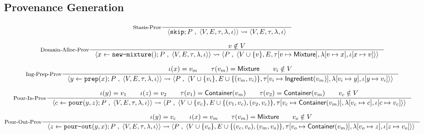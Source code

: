 \documentclass[11pt, a4paper]{article}
\begin{document}
\begin{landscape}
    
\section{Provenance Generation}
\label{prov-gen}
    \[
    \inference[\text{Stasis-Prov}]{}
    {
    \langle
    \text{\texttt{skip}} ; P \;,\;
    \langle V,E,\tau,\lambda,\iota\rangle
    \rangle
    \rightsquigarrow
    \langle V,E,\tau,\lambda,\iota\rangle
    }
    \]

    \[
    \inference[\text{Domain-Alloc-Prov}]
    {
    v \notin V
    }
    {
    \left\langle
    x \leftarrow \text{\texttt{new-mixture}}() ; P \;,\;
    \langle V,E,\tau,\lambda,\iota\rangle
    \right\rangle
    \rightsquigarrow
    \left\langle
    P \;,\;
    \left\langle
    V \cup \{v\},
    E,
    \tau[v \mapsto \textsf{Mixture}],
    \lambda[v \mapsto x],
    \iota[x \mapsto v]
    \right\rangle
    \right\rangle
    }
    \]
    
    \[
    \inference[\text{Ing-Prep-Prov}]
    {
    \iota(x)=v_m
    \qquad
    \tau(v_m)=\mathsf{Mixture}
    \qquad
    v_i \notin V
    }
    {
    \left\langle
    y \leftarrow \text{\texttt{prep}}(x) ; P \;,\;
    \langle V,E,\tau,\lambda,\iota\rangle
    \right\rangle
    \rightsquigarrow
    \left\langle
    P \;,\;
    \left\langle
    V \cup \{v_i\},
    E \cup \{(v_m,v_i)\},
    \tau[v_i \mapsto \mathsf{Ingredient}(v_m)],
    \lambda[v_i \mapsto y],
    \iota[y \mapsto v_i]
    \right\rangle
    \right\rangle
    }
    \]
    
    \[
    \inference[\text{Pour-In-Prov}]
    {
    \iota(y)=v_1
    \qquad
    \iota(z)=v_2
    \qquad
    \tau(v_1)=\mathsf{Container}(v_m)
    \qquad
    \tau(v_2)=\mathsf{Container}(v_m)
    \qquad
    v_c \notin V
    }
    {
    \left\langle
    c \leftarrow \text{\texttt{pour}}(y,z) ; P \;,\;
    \langle V,E,\tau,\lambda,\iota\rangle
    \right\rangle
    \rightsquigarrow
    \left\langle
    P \;,\;
    \left\langle
    V \cup \{v_c\},
    E \cup \{(v_1,v_c),(v_2,v_c)\},
    \tau[v_c \mapsto \mathsf{Container}(v_m)],
    \lambda[v_c \mapsto c],
    \iota[c \mapsto v_c]
    \right\rangle
    \right\rangle
    }
    \]
    
    \[
    \inference[\text{Pour-Out-Prov}]
    {
    \iota(y)=v_c
    \qquad
    \iota(x)=v_m
    \qquad
    \tau(v_m)=\mathsf{Mixture}
    \qquad
    v_o \notin V
    }
    {
    \left\langle
    z \leftarrow \text{\texttt{pour-out}}(y,x) ; P \;,\;
    \langle V,E,\tau,\lambda,\iota\rangle
    \right\rangle
    \rightsquigarrow
    \left\langle
    P \;,\;
    \left\langle
    V \cup \{v_o\},
    E \cup \{(v_c,v_o),(v_m,v_o)\},
    \tau[v_o \mapsto \mathsf{Container}(v_m)],
    \lambda[v_o \mapsto z],
    \iota[z \mapsto v_o]
    \right\rangle
    \right\rangle
    }
    \]
\end{landscape}
\end{document}
